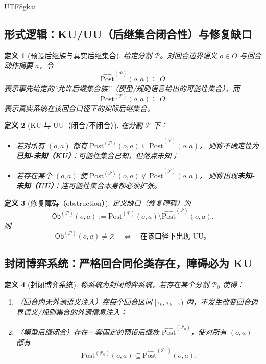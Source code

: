 \documentclass[12pt]{article}
\newtheorem{definition}{定义}[section]
\begin{document}
\begin{CJK*}{UTF8}{gkai}
\subsection{形式逻辑：KU/UU（后继集合闭合性）与修复缺口}
\label{sec:round-refinement-ku-uu}

\begin{definition}[预设后继族与真实后继集合]
\label{def:round-post-model}
给定分割 $\mathcal{P}$。对回合边界语义 $o\in O$ 与回合动作摘要 $a$，令
\[
  \widehat{\mathrm{Post}}^{(\mathcal{P})}(o,a)\subseteq O
\]
表示事先给定的“允许后继集合族”（模型/规则语言给出的可能性集合），而
\[
  \mathrm{Post}^{(\mathcal{P})}(o,a)\subseteq O
\]
表示真实系统在该回合口径下的实际后继集合。
\end{definition}

\begin{definition}[KU 与 UU（闭合/不闭合）]
\label{def:round-ku-uu}
在分割 $\mathcal{P}$ 下：
\begin{itemize}
  \item 若对所有 $(o,a)$ 都有 $\mathrm{Post}^{(\mathcal{P})}(o,a)\subseteq \widehat{\mathrm{Post}}^{(\mathcal{P})}(o,a)$，
  则称不确定性为\textbf{已知-未知（KU）}：可能性集合已知，但落点未知；
  \item 若存在某个 $(o,a)$ 使 $\mathrm{Post}^{(\mathcal{P})}(o,a)\not\subseteq \widehat{\mathrm{Post}}^{(\mathcal{P})}(o,a)$，
  则称出现\textbf{未知-未知（UU）}：连可能性集合本身都必须扩张。
\end{itemize}
\end{definition}

\begin{definition}[修复障碍（obstruction）]
\label{def:round-obstruction}
定义缺口（修复障碍）为
\[
  \mathsf{Ob}^{(\mathcal{P})}(o,a):=\mathrm{Post}^{(\mathcal{P})}(o,a)\setminus \widehat{\mathrm{Post}}^{(\mathcal{P})}
    (o,a).
\]
则
\[
  \mathsf{Ob}^{(\mathcal{P})}(o,a)\neq\varnothing \quad\Longleftrightarrow\quad \text{在该口径下出现 UU。}
\]
\end{definition}

\subsection{封闭博弈系统：严格回合同伦类存在，障碍必为 KU}
\label{sec:round-refinement-closed}

\begin{definition}[封闭博弈系统]
\label{def:closed-game-system-round}
称系统为封闭博弈系统，若存在某个分割 $\mathcal{P}_0$ 使得：
\begin{enumerate}
  \item （回合内无外源语义注入）在每个回合区间 $[\tau_k,\tau_{k+1})$ 内，不发生改变回合边界语义/规则集合的外源信息注入；
  \item （模型后继闭合）存在一套固定的预设后继族 $\widehat{\mathrm{Post}}^{(\mathcal{P}_0)}$，使对所有 $(o,a)$ 都有
  \[
    \mathrm{Post}^{(\mathcal{P}_0)}(o,a)\subseteq \widehat{\mathrm{Post}}^{(\mathcal{P}_0)}(o,a).
  \]
\end{enumerate}
\end{definition}


\end{CJK*}
\end{document}
